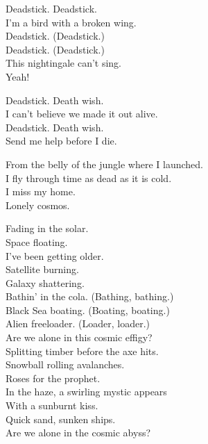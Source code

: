 
Deadstick. Deadstick. \\
I'm a bird with a broken wing. \\
Deadstick. (Deadstick.) \\
Deadstick. (Deadstick.) \\
This nightingale can't sing. \\
Yeah! \\


Deadstick. Death wish. \\
I can't believe we made it out alive. \\
Deadstick. Death wish. \\
Send me help before I die. \\





From the belly of the jungle where I launched. \\
I fly through time as dead as it is cold. \\
I miss my home. \\
Lonely cosmos. \\


Fading in the solar. \\
Space  floating. \\
I've been getting older. \\
Satellite burning. \\
Galaxy shattering. \\

Bathin' in the cola. (Bathing, bathing.) \\
Black Sea boating. (Boating, boating.) \\
Alien freeloader. (Loader, loader.) \\
Are we alone in this cosmic effigy? \\

Splitting timber before the axe hits. \\
Snowball rolling avalanches. \\
Roses for the prophet. \\
In the haze, a swirling mystic appears \\
With a sunburnt kiss. \\
Quick sand, sunken ships. \\
Are we alone in the cosmic abyss? \\

